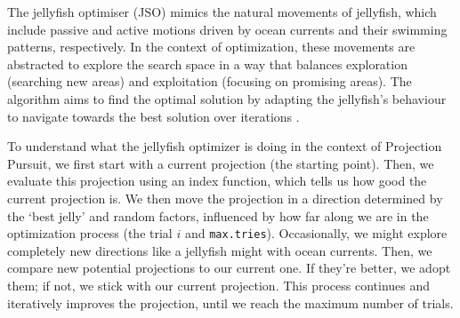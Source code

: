 \documentclass[
  number,
  preprint,
  3p]{elsarticle}
\begin{document}
The jellyfish optimiser (JSO) mimics the natural movements of jellyfish,
which include passive and active motions driven by ocean currents and
their swimming patterns, respectively. In the context of optimization,
these movements are abstracted to explore the search space in a way that
balances exploration (searching new areas) and exploitation (focusing on
promising areas). The algorithm aims to find the optimal solution by
adapting the jellyfish's behaviour to navigate towards the best solution
over iterations \citep{chou_novel_2021}.

To understand what the jellyfish optimizer is doing in the context of
Projection Pursuit, we first start with a current projection (the
starting point). Then, we evaluate this projection using an index
function, which tells us how good the current projection is. We then
move the projection in a direction determined by the `best jelly' and
random factors, influenced by how far along we are in the optimization
process (the trial \(i\) and \texttt{max.tries}). Occasionally, we might
explore completely new directions like a jellyfish might with ocean
currents. Then, we compare new potential projections to our current one.
If they're better, we adopt them; if not, we stick with our current
projection. This process continues and iteratively improves the
projection, until we reach the maximum number of trials.
\end{document}
